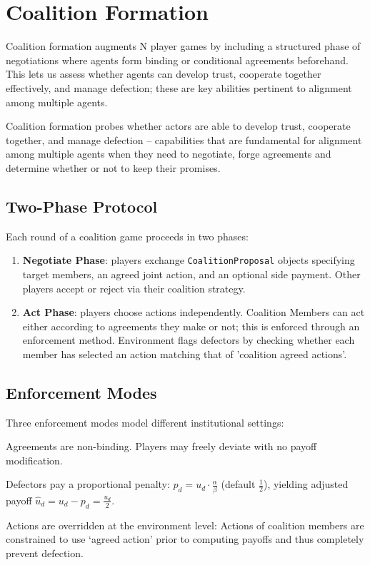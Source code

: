 
\section{Coalition Formation}
\label{sec:coalition}

Coalition formation augments N player games by including a structured phase of negotiations where agents form binding or conditional agreements beforehand. This lets us assess whether agents can develop trust, cooperate together effectively, and manage defection; these are key abilities pertinent to alignment among multiple agents.

Coalition formation probes whether actors are able to develop trust, cooperate together, and manage defection – capabilities that are fundamental for alignment among multiple agents when they need to negotiate, forge agreements and determine whether or not to keep their promises.

\subsection{Two-Phase Protocol}
\label{sec:coalition-protocol}

Each round of a coalition game proceeds in two phases:

\begin{enumerate}[nosep]
    \item \textbf{Negotiate Phase}: players exchange \texttt{CoalitionProposal}
          objects specifying target members, an agreed joint action, and an optional
          side payment. Other players accept or reject via their coalition strategy.
    \item \textbf{Act Phase}: players choose actions independently. Coalition
Members can act either according to agreements they make or not; this is enforced through an enforcement method. Environment flags defectors by checking whether each member has selected an action matching that of 'coalition agreed actions'.
\end{enumerate}

\subsection{Enforcement Modes}
\label{sec:enforcement}

Three enforcement modes model different institutional settings:

\begin{description}[nosep]
    \item[Cheap Talk.] Agreements are non-binding. Players may freely
        deviate with no payoff modification.
    \item[Penalty.] Defectors pay a proportional penalty:
        $p_d = u_d \cdot \frac{\alpha}{\beta}$ (default $\frac{1}{2}$),
        yielding adjusted payoff $\hat{u}_d = u_d - p_d = \frac{u_d}{2}$.
    \item[Binding.] Actions are overridden at the environment level:
Actions of coalition members are constrained to use `agreed action' prior to computing payoffs and thus completely prevent defection.
\end{description}

